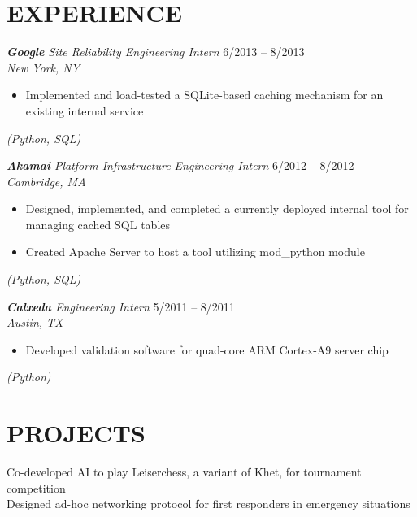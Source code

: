 \documentclass[margin]{res}
\begin{document}
\begin{resume}
\section{EXPERIENCE} 
                    {\sl{\bf Google} Site Reliability Engineering Intern} 
                    \hfill 6/2013 -- 8/2013 \\
                    {\sl  New York, NY}
                    \begin{itemize} \itemsep -2pt %
                        \setlength{\topsep}{0pt}
                         \item Implemented and load-tested a SQLite-based
                           caching mechanism for an existing internal service
                    \end{itemize} 
                    \vspace{-4.5mm} {\sl (Python, SQL)}

                    {\sl {\bf Akamai} 
                      Platform Infrastructure Engineering Intern} 
                    \hfill 6/2012 -- 8/2012 \\
                    {\sl Cambridge, MA}
                    \begin{itemize} \itemsep -2pt %
                         \item Designed, implemented, and completed a 
                           currently deployed internal tool for managing cached 
                           SQL tables
                         \item Created Apache Server to host a tool utilizing 
                           mod\_python module 
                    \end{itemize}
                    \vspace{-4.5mm} {\sl (Python, SQL)}

                    {\sl {\bf Calxeda} Engineering Intern} 
                    \hfill 5/2011 -- 8/2011 \\
                    {\sl Austin, TX}
                    \begin{itemize} \itemsep -2pt %
                          \item Developed validation software for quad-core ARM 
                            Cortex-A9 server chip
                    \end{itemize}
                    \vspace{-4.5mm} {\sl (Python)}

\section{PROJECTS}  Co-developed AI to play Leiserchess, a variant of Khet, for 
                      tournament competition \\
                    Designed ad-hoc networking protocol for first responders in
                      emergency situations
 

\end{resume}
\end{document}
